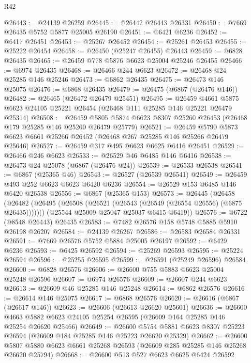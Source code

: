 \begin{lexlean}{R42}
\begin{coremodule}
{@26443 := @24139 @26259
@26445 := @26442 @26443 @26331
@26450 := @7669 @26435 @5752 @5877 @25005 @26190
@26451 := @6421 @6236
@26452 := @6417 @26451
@26453 := @25267 @26452
@26454 := @25261 @26453
@26455 := @25222 @26454
@26458 := @26450 (@25247 @26455) @26443
@26459 := @6828 @26435
@26465 := @26459 @778 @5876 @6623 @25004 @25246 @26455
@26466 := @6974 @26435
@26468 := @26466 @244 @6623
@26472 := @26468 @24 @25285 @146 @25246
@26473 := @6862 @26435
@26475 := @26473 @146 @25075
@26476 := @6868 @26435
@26479 := @26475 (@6867 (@26476 @146))
@26482 := @26465 (@26472 @26479 @25451)
@26495 := @26459
    @4661
    @5875
    @6623
    @24105
    @25221
    @26454
    (@26468 @111 @25285 @146 @25221 @26479 @25314)
@26508 := @26459
    @5805
    @5874
    @6623
    @8307
    @25260
    @26453
    (@26468 @179 @25285 @146 @25260 @26479 @25779)
@26521 := @26459
    @5790
    @5873
    @6623
    @6661
    @25266
    @26452
    (@26468 @267 @25285 @146 @25266 @26479 @25646)
@26527 := @26459 @317 @495 @6623 @6625 @6416 @26451
@26529 := @26466 @246 @6623
@26533 := @26529 @46 @6485 @146 @6416
@26538 := @26473 @24 @25078 (@6867 (@26476 @24))
@26539 := @26533 @26538
@26541 := @6867 (@25365 @46)
@26543 := @26527 (@26539 @26541)
@26549 := @26459 @493 @252 @6623 @6623 @6420 @6236
@26554 := @26529 @153 @6485 @146 @6420 @26538
@26556 := @6867 (@25365 @153)
@26573 := @26445
    (@26458
      (@26482 (@26495 (@26508 (@26521 (@26543 (@26549 (@26554 @26556) (@6875 @26435)))))))
      (@25544 @25009 @25047 @25037 @6415 @6419))
@26576 := @6722 (@8548 @26443) @26435
@26583 := @7482 @26576 @158 @5748 @5885 @5910 @26198 @26207
@26584 := @24139 @26267
@26586 := @26583 @26584 @26331
@26591 := @7669 @26576 @5752 @5884 @25005 @26197
@26592 := @6429 @6236
@26593 := @6425 @26592
@26594 := @25269 @26593
@26595 := @25224 @26594
@26596 := @25255 @26595
@26599 := @26591 (@25249 @26596) @26584
@26600 := @6828 @26576
@26606 := @26600 @755 @5883 @6623 @25004 @25248 @26596
@26607 := @6974 @26576
@26609 := @26607 @244 @6623
@26613 := @26609 @46 @25285 @146 @25248
@26614 := @6862 @26576
@26616 := @26614 @146 @25075
@26617 := @6868 @26576
@26620 := @26616 (@6867 (@26617 @146))
@26623 := @26606 (@26613 @26620 @25601)
@26636 := @26600
    @4663
    @5882
    @6623
    @24105
    @25254
    @26595
    (@26609 @164 @25285 @146 @25254 @26620 @25466)
@26649 := @26600
    @5754
    @5881
    @6623
    @8307
    @25223
    @26594
    (@26609 @184 @25285 @146 @25223 @26620 @25329)
@26662 := @26600
    @5807
    @5880
    @6623
    @6661
    @25268
    @26593
    (@26609 @285 @25285 @146 @25268 @26620 @25794)
@26668 := @26600 @513 @527 @6623 @6625 @6424 @26592
}
\end{coremodule}
\end{lexlean}
